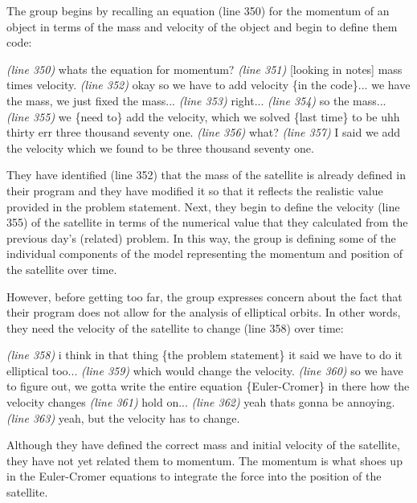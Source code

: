 \documentclass{msuphddissertation}
\begin{document}
\begin{doublespace}
The group begins by recalling an equation (line 350) for the momentum of an object in terms of the mass and velocity of the object and begin to define them code: \begin{description}
\SA \textit{(line 350)} whats the equation for momentum?	
\SB \textit{(line 351)} [looking in notes] mass times velocity.
\SA \textit{(line 352)} okay so we have to add velocity \{in the code\}... we have the mass, we just fixed the mass...
\SB \textit{(line 353)} right...
\SC \textit{(line 354)} so the mass...	
\SA \textit{(line 355)} we \{need to\} add the velocity, which we solved \{last time\} to be uhh thirty err three thousand seventy one.
\SB \textit{(line 356)} what?		
\SA \textit{(line 357)} I said we add the velocity which we found to be three thousand seventy one.\end{description}  They have identified (line 352) that the mass of the satellite is already defined in their program and they have modified it so that it reflects the realistic value provided in the problem statement.  Next, they begin to define the velocity (line 355) of the satellite in terms of the numerical value that they calculated from the previous day's (related) problem.  In this way, the group is defining some of the individual components of the model representing the momentum and position of the satellite over time.

However, before getting too far, the group expresses concern about the fact that their program does not allow for the analysis of elliptical orbits.  In other words, they need the velocity of the satellite to change (line 358) over time:  \begin{description}
\SB \textit{(line 358)} i think in that thing \{the problem statement\} it said we have to do it elliptical too...
\SB \textit{(line 359)} which would change the velocity.		
\SB \textit{(line 360)} so we have to figure out, we gotta write the entire equation \{Euler-Cromer\} in there how the velocity changes		
\SA \textit{(line 361)} hold on...
\SB \textit{(line 362)} yeah thats gonna be annoying.		
\SB \textit{(line 363)} yeah, but the velocity has to change.\end{description}  Although they have defined the correct mass and initial velocity of the satellite, they have not yet related them to momentum.  The momentum is what shoes up in the Euler-Cromer equations to integrate the force into the position of the satellite.


\end{doublespace}
\end{document}
